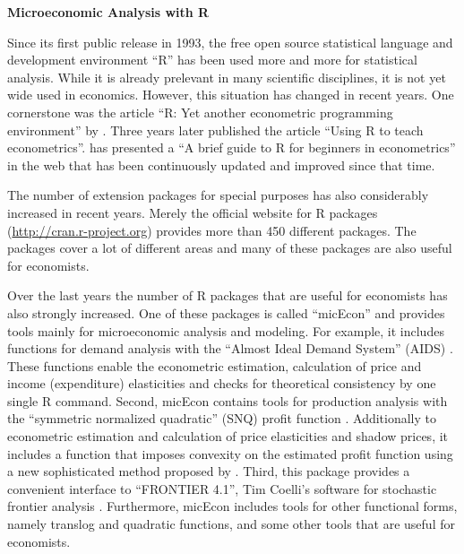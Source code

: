 \documentclass[12pt,english]{article}
\begin{document}
\begin{center}\textbf{\LARGE Microeconomic Analysis with R}\end{center}{\LARGE \par}

\bigskip

Since its first public release in 1993, the free open source statistical
language and development environment ``R'' \citep{r-project} has been used more
and more for statistical analysis.
While it is already prelevant in many scientific disciplines, 
it is not yet wide used in economics.
However, this situation has changed in recent years.
One cornerstone was the article ``R: Yet another econometric programming
environment'' by \citet{cribari99}.
Three years later \citet{racine02} published the article ``Using R to teach
econometrics''. 
\citet{arai02} has presented a ``A brief guide to R for beginners in econometrics''
in the web that has been continuously updated and improved since that time.

The number of extension packages for special purposes has also considerably 
increased in recent years.
Merely the official website for R packages (\url{http://cran.r-project.org})
provides more than 450 different packages.
The packages cover a lot of different areas and many of these packages are also
useful for economists.

Over the last years the number of R packages that are useful for economists
has also strongly increased. 
One of these packages is called ``micEcon'' \citep{r-micecon} and provides
tools mainly for microeconomic analysis and modeling.
For example, it includes functions for demand analysis with the
``Almost Ideal Demand System'' (AIDS) \citep{deaton80a}.
These functions enable the econometric estimation, calculation of price and
income (expenditure) elasticities and checks for theoretical consistency
by one single R command.
Second, micEcon contains tools for production analysis with the
``symmetric normalized quadratic'' (SNQ) profit function
\citep{diewert87,diewert92,kohli93}.  
Additionally to econometric estimation and calculation of price elasticities
and shadow prices, it includes a function that imposes convexity on the 
estimated profit function using a new sophisticated method proposed by
\citet{koebel03}.
Third, this package provides a convenient interface to ``FRONTIER 4.1'', Tim
Coelli's software for stochastic frontier analysis \citep{coelli96}.
Furthermore, micEcon includes tools for other functional forms, namely
translog and quadratic functions, and some other tools that are useful
for economists.
\end{document}

